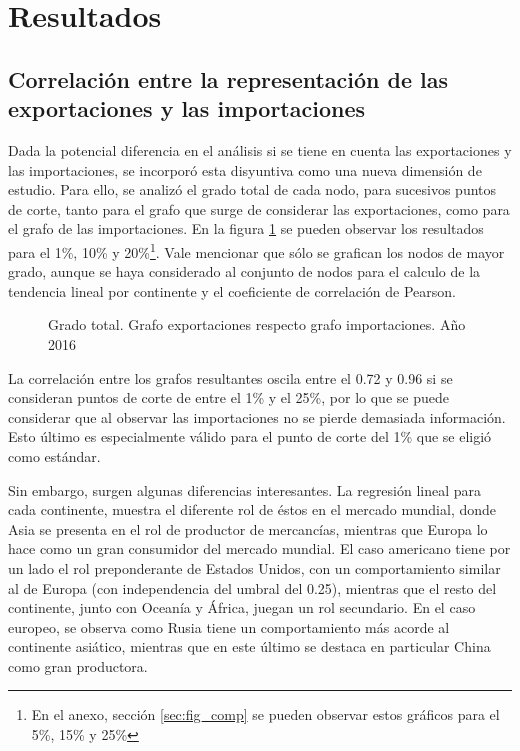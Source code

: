 \documentclass[class=article, crop=false]{standalone}
\begin{document}
\section{Resultados}\label{sec:c2resultados}


\subsection{Correlación entre la representación de las exportaciones y las importaciones}

Dada la potencial diferencia en el análisis si se tiene en cuenta las exportaciones y las importaciones, se incorporó esta disyuntiva como una nueva dimensión de estudio. Para ello, se analizó el grado total de cada nodo, para sucesivos puntos de corte, tanto para el grafo que surge de considerar las exportaciones, como para el grafo de las importaciones. En la figura \ref{fig:corr} se pueden observar los resultados para el 1\%, 10\% y 20\%\footnote{En el anexo, sección \ref{sec:fig_comp} se pueden observar estos gráficos para el 5\%, 15\% y 25\%}. Vale mencionar que sólo se grafican los nodos de mayor grado, aunque se haya considerado al conjunto de nodos para el calculo de la tendencia lineal por continente y el coeficiente de correlación de Pearson.


\begin{figure}
\centering
{}
\caption{Grado total. Grafo exportaciones respecto grafo importaciones. Año 2016}
\label{fig:corr}
\end{figure}


La correlación entre los grafos resultantes oscila entre el 0.72 y 0.96 si se consideran puntos de corte de entre el 1\% y el 25\%, por lo que se puede considerar que al observar las importaciones no se pierde demasiada información. Esto último es especialmente válido para el punto de corte del 1\% que se eligió como estándar. 

Sin embargo, surgen algunas diferencias interesantes. La regresión lineal para cada continente, muestra el diferente rol de éstos en el mercado mundial, donde Asia se presenta en el rol de productor de mercancías, mientras que Europa lo hace como un gran consumidor del mercado mundial. El caso americano tiene por un lado el rol preponderante de Estados Unidos, con un comportamiento similar al de Europa (con independencia del umbral del 0.25), mientras que el resto del continente, junto con Oceanía y África, juegan un rol secundario. En el caso europeo, se observa como Rusia tiene un comportamiento más acorde al continente asiático, mientras que en este último se destaca en particular China como gran productora.      
\end{document}
